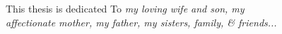     \newpage
    \vspace*{8cm}
    \begin{center}
        \Large This thesis is dedicated To \emph{my loving wife and son, my \\
        affectionate mother, my father, my sisters, family, \& friends...}
    \end{center}